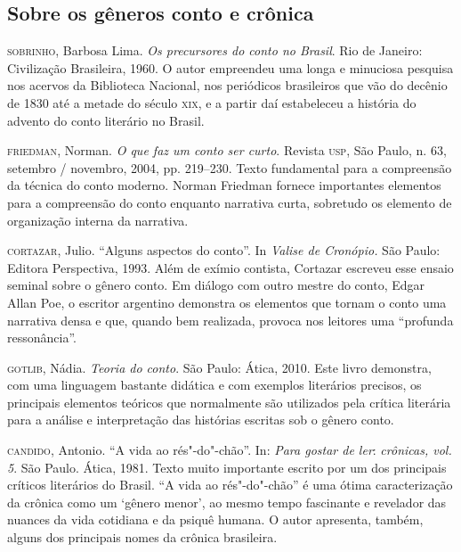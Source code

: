 \documentclass{extarticle}
\begin{document}

\subsection{Sobre os gêneros conto e crônica}

\textsc{sobrinho}, Barbosa Lima. \emph{Os precursores do conto no Brasil}. Rio de
Janeiro: Civilização Brasileira, 1960. O autor empreendeu uma longa e
minuciosa pesquisa nos acervos da Biblioteca Nacional, nos periódicos
brasileiros que vão do decênio de 1830 até a metade do século \textsc{xix}, e a
partir daí estabeleceu a história do advento do conto literário no
Brasil.

\textsc{friedman}, Norman. \emph{O que faz um conto ser curto}. Revista \textsc{usp}, São
Paulo, n. 63, setembro / novembro, 2004, pp. 219--230. Texto
fundamental para a compreensão da técnica do conto moderno. Norman
Friedman fornece importantes elementos para a compreensão do conto
enquanto narrativa curta, sobretudo os elemento de organização interna
da narrativa.

\textsc{cortazar}, Julio. ``Alguns aspectos do conto''. In \emph{Valise de
Cronópio.} São Paulo: Editora Perspectiva, 1993. Além de exímio
contista, Cortazar escreveu esse ensaio seminal sobre o gênero conto. Em
diálogo com outro mestre do conto, Edgar Allan Poe, o escritor argentino
demonstra os elementos que tornam o conto uma narrativa densa e que,
quando bem realizada, provoca nos leitores uma ``profunda ressonância''.

\textsc{gotlib}, Nádia. \emph{Teoria do conto}. São Paulo: Ática, 2010. Este
livro demonstra, com uma linguagem bastante didática e com exemplos
literários precisos, os principais elementos teóricos que normalmente
são utilizados pela crítica literária para a análise e interpretação das
histórias escritas sob o gênero conto.

\textsc{candido}, Antonio. ``A vida ao rés"-do"-chão''. In: \emph{Para gostar de
ler}: \emph{crônicas, vol. 5}. São Paulo. Ática, 1981. Texto muito
importante escrito por um dos principais críticos literários do Brasil.
``A vida ao rés"-do"-chão'' é uma ótima caracterização da crônica como um
`gênero menor', ao mesmo tempo fascinante e revelador das nuances da
vida cotidiana e da psiquê humana. O autor apresenta, também, alguns dos
principais nomes da crônica brasileira.
\end{document}
